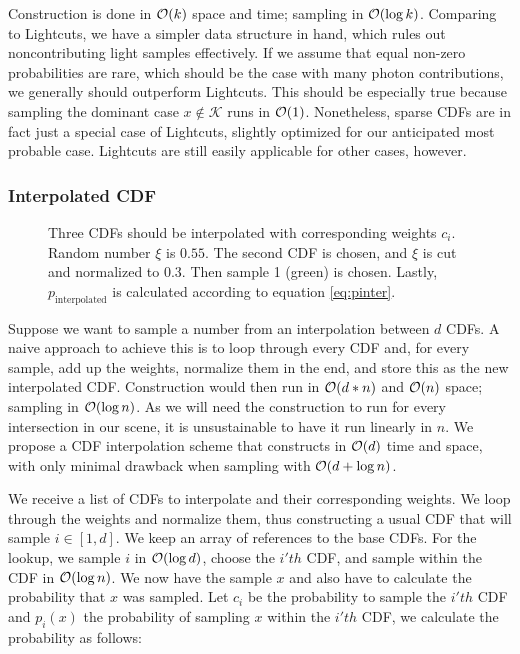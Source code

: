 Construction is done in $\mathcal{O}(k)$ space and time; sampling in $\mathcal{O}(\log{k})$. Comparing to Lightcuts, we have a simpler data structure in hand, which rules out noncontributing light samples effectively. If we assume that equal non-zero probabilities are rare, which should be the case with many photon contributions, we generally should outperform Lightcuts. This should be especially true because sampling the dominant case $x \notin \mathcal{K}$ runs in $\mathcal{O}(1)$. Nonetheless, sparse CDFs are in fact just a special case of Lightcuts, slightly optimized for our anticipated most probable case. Lightcuts are still easily applicable for other cases, however. 

\subsubsection{Interpolated CDF}
\label{sec:intcdf}
\begin{figure}[htb] 
	\centering
    
    \caption{Three CDFs should be interpolated with corresponding weights $c_i$. Random number $\xi$ is $0.55$. The second CDF is chosen, and $\xi$ is cut and normalized to $0.3$. Then sample 1 (green) is chosen. Lastly, $p_{\text{interpolated}}$ is calculated according to equation \ref{eq:pinter}.} 
    \label{fig:interpolatedCDF}
\end{figure}

Suppose we want to sample a number from an interpolation between $d$ CDFs. A naive approach to achieve this is to loop through every CDF and, for every sample, add up the weights, normalize them in the end, and store this as the new interpolated CDF. Construction would then run in $\mathcal{O}(d * n)$ and $\mathcal{O}(n)$ space; sampling in $\mathcal{O}(\log{n})$. As we will need the construction to run for every intersection in our scene, it is unsustainable to have it run linearly in $n$. We propose a CDF interpolation scheme that constructs in $\mathcal{O}(d)$ time and space, with only minimal drawback when sampling with $\mathcal{O}(d + \log{n})$.

We receive a list of CDFs to interpolate and their corresponding weights. We loop through the weights and normalize them, thus constructing a usual CDF that will sample $i \in [1,d]$. We keep an array of references to the base CDFs. For the lookup, we sample $i$ in $\mathcal{O}(\log{d})$, choose the $i'th$ CDF, and sample within the CDF in $\mathcal{O}(\log{n})$. We now have the sample $x$ and also have to calculate the probability that $x$ was sampled. Let $c_i$ be the probability to sample the $i'th$ CDF and $p_i(x)$ the probability of sampling $x$ within the $i'th$ CDF, we calculate the probability as follows:

